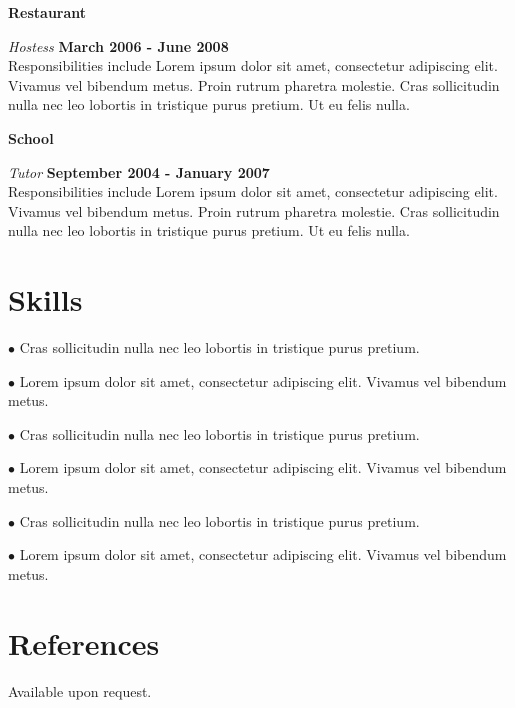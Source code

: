 \documentclass[margin,line]{res}
\newenvironment{list1}{
  \begin{list}{\ding{113}}{%
      \setlength{\itemsep}{0in}
      \setlength{\parsep}{0in} \setlength{\parskip}{0in}
      \setlength{\topsep}{0in} \setlength{\partopsep}{0in} 
      \setlength{\leftmargin}{0.17in}}}{\end{list}}
\begin{document}
\begin{resume}
{\bf Restaurant}

\vspace{-.3cm}
{\em Hostess} \hfill {\bf March 2006 - June 2008}\\
Responsibilities include Lorem ipsum dolor sit amet, consectetur adipiscing elit. Vivamus vel bibendum metus. Proin rutrum pharetra molestie. Cras sollicitudin nulla nec leo lobortis in tristique purus pretium. Ut eu felis nulla.

{\bf School}

\vspace{-.3cm}
{\em Tutor} \hfill {\bf September 2004 - January 2007}\\
Responsibilities include Lorem ipsum dolor sit amet, consectetur adipiscing elit. Vivamus vel bibendum metus. Proin rutrum pharetra molestie. Cras sollicitudin nulla nec leo lobortis in tristique purus pretium. Ut eu felis nulla.

\section{\sc Skills}
    \begin{list1}
        \item[] $\bullet$ Cras sollicitudin nulla nec leo lobortis in tristique purus pretium. 
        \item[] $\bullet$ Lorem ipsum dolor sit amet, consectetur adipiscing elit. Vivamus vel bibendum metus. 
        \item[] $\bullet$ Cras sollicitudin nulla nec leo lobortis in tristique purus pretium. 
        \item[] $\bullet$ Lorem ipsum dolor sit amet, consectetur adipiscing elit. Vivamus vel bibendum metus. 
        \item[] $\bullet$ Cras sollicitudin nulla nec leo lobortis in tristique purus pretium. 
        \item[] $\bullet$ Lorem ipsum dolor sit amet, consectetur adipiscing elit. Vivamus vel bibendum metus.       
    \end{list1}

\section{\sc References}
    Available upon request.

\end{resume}
\end{document}
